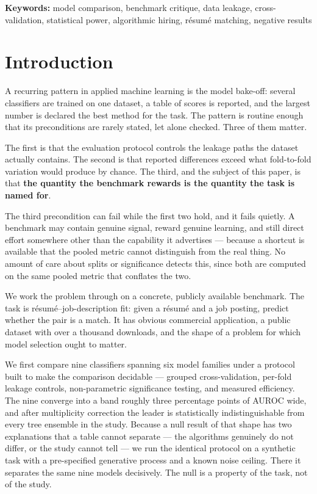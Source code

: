 \documentclass[11pt]{article}                      %
\begin{document}
\noindent\textbf{Keywords:} model comparison, benchmark critique, data leakage,
cross-validation, statistical power, algorithmic hiring, résumé matching,
negative results

\section{Introduction}

A recurring pattern in applied machine learning is the model bake-off: several
classifiers are trained on one dataset, a table of scores is reported, and the
largest number is declared the best method for the task. The pattern is routine
enough that its preconditions are rarely stated, let alone checked. Three of them
matter.

The first is that the evaluation protocol controls the leakage paths the dataset
actually contains. The second is that reported differences exceed what
fold-to-fold variation would produce by chance. The third, and the subject of
this paper, is that \textbf{the quantity the benchmark rewards is the quantity
the task is named for}.

The third precondition can fail while the first two hold, and it fails quietly. A
benchmark may contain genuine signal, reward genuine learning, and still direct
effort somewhere other than the capability it advertises --- because a shortcut is
available that the pooled metric cannot distinguish from the real thing. No
amount of care about splits or significance detects this, since both are computed
on the same pooled metric that conflates the two.

We work the problem through on a concrete, publicly available benchmark. The task
is résumé--job-description fit: given a résumé and a job posting, predict whether
the pair is a match. It has obvious commercial application, a public dataset with
over a thousand downloads, and the shape of a problem for which model selection
ought to matter.

We first compare nine classifiers spanning six model families under a protocol
built to make the comparison decidable --- grouped cross-validation, per-fold
leakage controls, non-parametric significance testing, and measured efficiency.
The nine converge into a band roughly three percentage points of AUROC wide, and
after multiplicity correction the leader is statistically indistinguishable from
every tree ensemble in the study. Because a null result of that shape has two
explanations that a table cannot separate --- the algorithms genuinely do not
differ, or the study cannot tell --- we run the identical protocol on a synthetic
task with a pre-specified generative process and a known noise ceiling. There it
separates the same nine models decisively. The null is a property of the task,
not of the study.
\end{document}
